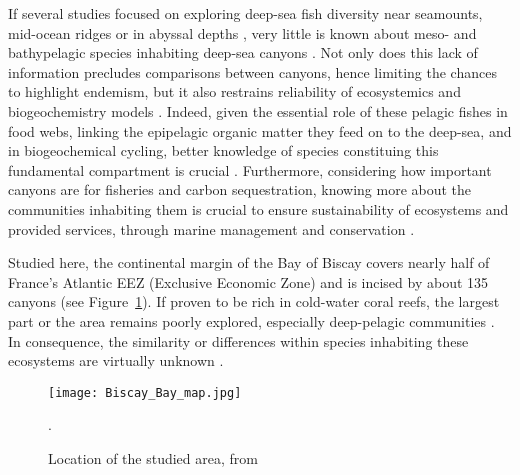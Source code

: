 
If several studies focused on exploring deep-sea fish diversity near seamounts, mid-ocean ridges or in abyssal depths \citep{cook2013,sutton2013}, very little is known about meso- and bathypelagic species inhabiting deep-sea canyons \citep{kenchington2020}. Not only does this lack of information precludes comparisons between canyons, hence limiting the chances to highlight endemism, but it also restrains reliability of ecosystemics and biogeochemistry models \citep{davison2015,kenchington2020}. Indeed, given the essential role of these pelagic fishes in food webs, linking the epipelagic organic matter they feed on to the deep-sea, and in biogeochemical cycling, better knowledge of species constituing this fundamental compartment is crucial \citep{davison2015,gaskett2001}. Furthermore, considering how important canyons are for fisheries and carbon sequestration, knowing more about the communities inhabiting them is crucial to ensure sustainability of ecosystems and provided services, through marine management and conservation \citep{fernandez-arcaya2017,vandenbeld2017a}.

Studied here, the continental margin of the Bay of Biscay covers nearly half of France's Atlantic EEZ (Exclusive Economic Zone) and is incised by about 135 canyons \citep{bourillet2006,spitz2019,vandenbeld2017} (see Figure~\ref{fig:bbm}). If proven to be rich in cold-water coral reefs, the largest part or the area remains poorly explored, especially deep-pelagic communities \citep{garcia2021,vandenbeld2017a,webb2010}. In consequence, the similarity or differences within species inhabiting these ecosystems are virtually unknown \citep{kenchington2020}. 

\begin{figure} [!htbp]
	\begin{center}
		\texttt{[image: Biscay\_Bay\_map.jpg]}
	\end{center}
	\caption{Location of the studied area, from \citep{mulder2012}}.
	\label{fig:bbm}
\end{figure}


